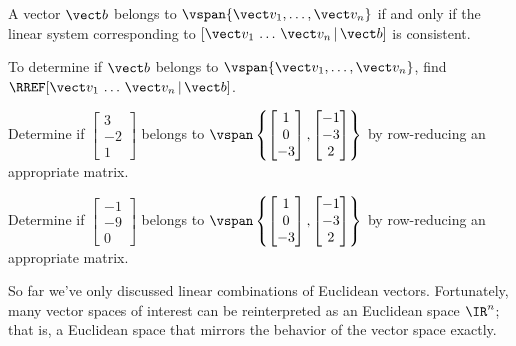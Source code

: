 


\begin{applicationActivities}{3}{9}

\begin{fact}
  A vector \(\vect b\) belongs to
  \(\vspan\{\vect v_1,\dots,\vect v_n\}\) if and only if
  the linear system corresponding to
  \([\vect v_1\,\dots\,\vect v_n \,|\, \vect b]\)
  is consistent.
\end{fact}

\begin{remark}
  To determine if \(\vect b\) belongs to
  \(\vspan\{\vect v_1,\dots,\vect v_n\}\), find
  \(\RREF[\vect v_1\,\dots\,\vect v_n \,|\, \vect b]\).
\end{remark}

\begin{activity}{5}
  Determine if
  \(\begin{bmatrix}3\\-2\\1\end{bmatrix}\) belongs to
  \(\vspan\left\{\begin{bmatrix}1\\0\\-3\end{bmatrix},
  \begin{bmatrix}-1\\-3\\2\end{bmatrix}\right\}\)
  by row-reducing an appropriate matrix.
\end{activity}

\begin{activity}{5}
  Determine if
  \(\begin{bmatrix}-1\\-9\\0\end{bmatrix}\) belongs to
  \(\vspan\left\{\begin{bmatrix}1\\0\\-3\end{bmatrix},
  \begin{bmatrix}-1\\-3\\2\end{bmatrix}\right\}\)
  by row-reducing an appropriate matrix.
\end{activity}


\begin{observation}
  So far we've only discussed linear combinations of Euclidean vectors.
  Fortunately, many vector spaces of interest can be reinterpreted as an
   Euclidean space \(\IR^n\); that is, a Euclidean space
  that mirrors the behavior of the vector space exactly.
\end{observation}


\end{applicationActivities}
